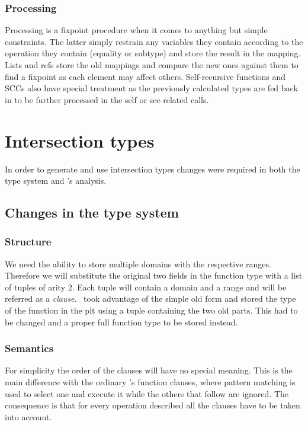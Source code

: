 \subsubsection{Processing}
\label{sct:orig_processing}

Processing is a fixpoint procedure when it comes to anything but
simple constraints. The latter simply restrain any variables they
contain according to the operation they contain (equality or subtype)
and store the result in the mapping. Lists and refs store the old
mappings and compare the new ones against them to find a fixpoint as
each element may affect others. Self-recursive functions and SCCs also
have special treatment as the previously calculated types are fed back
in to be further processed in the self or scc-related calls.

\section{Intersection types}
\label{sct:intersection_types}

In order to generate and use intersection types changes were required
in both the type system and \dr's analysis.

\subsection{Changes in the type system}
\label{sct:intersection_type_system}

\subsubsection{Structure}
\label{sct:intersection_representation}

We need the ability to store multiple domains with the respective
ranges. Therefore we will substitute the original two fields in the
function type with a list of tuples of arity 2. Each tuple will
contain a domain and a range and will be referred as a \emph{clause}.
\dr\ took advantage of the simple old form and stored the type of the
function in the plt using a tuple containing the two old parts. This
had to be changed and a proper full function type to be stored
instead.

\subsubsection{Semantics}
\label{sct:intersection_semantics}

For simplicity the order of the clauses will have no special
meaning. This is the main difference with the ordinary \er's function
clauses, where pattern matching is used to select one and execute it
while the others that follow are ignored. The consequence is that for
every operation described all the clauses have to be taken into
account.

